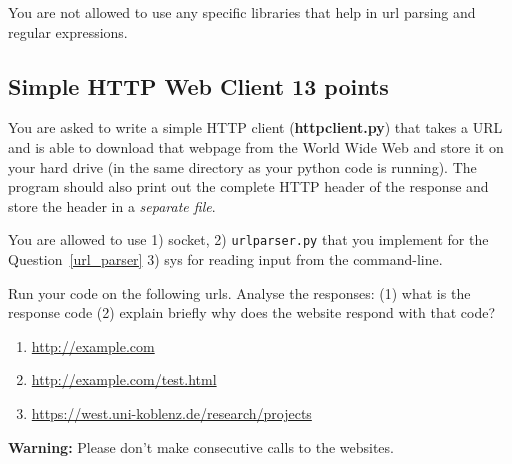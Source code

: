 \documentclass{resources/WeSTassignment}
\begin{document}
You are not allowed to use any specific libraries that help in url parsing and regular expressions. 

\subsection{Simple HTTP Web Client \hfill{13 points}}
You are asked to write a simple HTTP client (\textbf{httpclient.py})
that takes a URL and is able to download that webpage from the World Wide Web and store it on your hard drive (in the same
directory as your python code is running). The program should also print out the complete
HTTP header of the response and store the header in a \textit{separate file}.


You are allowed to use 1) socket, 2) \texttt{urlparser.py} that you implement for the Question~\ref{url_parser} 3) sys for reading input from the command-line. 


Run your code on the following urls. Analyse the responses: (1) what is the response code (2) explain briefly why does the website respond with that code? 
\begin{enumerate}
\item 
\url{http://example.com}
\item\url{http://example.com/test.html}
\item 
\url{https://west.uni-koblenz.de/research/projects}
\end{enumerate}

\textbf{Warning:} Please don't make consecutive calls to the websites.
\end{document}
